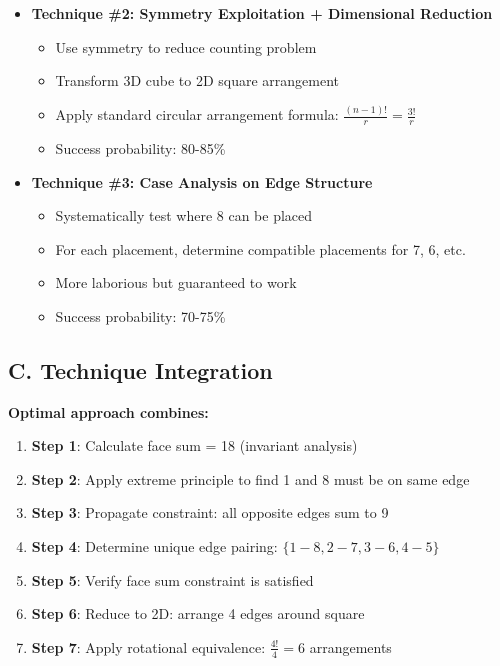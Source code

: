 \documentclass[]{article}
\begin{document}
\begin{techniquesbox}
\begin{itemize}[leftmargin=*]
    \item \textbf{Technique \#2: Symmetry Exploitation + Dimensional Reduction}
    \begin{itemize}
        \item Use symmetry to reduce counting problem
        \item Transform 3D cube to 2D square arrangement
        \item Apply standard circular arrangement formula: $\frac{(n-1)!}{r} = \frac{3!}{r}$
        \item Success probability: 80-85\%
    \end{itemize}
    
    \item \textbf{Technique \#3: Case Analysis on Edge Structure}
    \begin{itemize}
        \item Systematically test where 8 can be placed
        \item For each placement, determine compatible placements for 7, 6, etc.
        \item More laborious but guaranteed to work
        \item Success probability: 70-75\%
    \end{itemize}
\end{itemize}

\subsection*{C. Technique Integration}
\textbf{Optimal approach combines:}
\begin{enumerate}
    \item \textbf{Step 1}: Calculate face sum = 18 (invariant analysis)
    \item \textbf{Step 2}: Apply extreme principle to find 1 and 8 must be on same edge
    \item \textbf{Step 3}: Propagate constraint: all opposite edges sum to 9
    \item \textbf{Step 4}: Determine unique edge pairing: $\{1-8, 2-7, 3-6, 4-5\}$
    \item \textbf{Step 5}: Verify face sum constraint is satisfied
    \item \textbf{Step 6}: Reduce to 2D: arrange 4 edges around square
    \item \textbf{Step 7}: Apply rotational equivalence: $\frac{4!}{4} = 6$ arrangements
\end{enumerate}


\end{techniquesbox}
\end{document}
